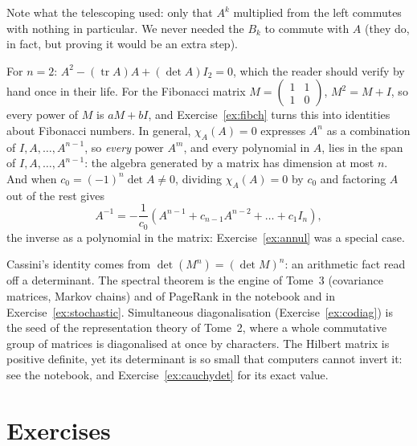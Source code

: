Note what the telescoping used: only that $A^k$ multiplied from the left commutes with nothing in particular. We never needed the $B_k$ to commute with $A$ (they do, in fact, but proving it would be an extra step).

\begin{examplex}
For $n=2$: $A^2-(\operatorname{tr}A)A+(\det A)I_2=0$, which the reader should verify by hand once in their life. For the Fibonacci matrix $M=\begin{pmatrix}1&1\\1&0\end{pmatrix}$, $M^2=M+I$, so every power of $M$ is $aM+bI$, and Exercise~\ref{ex:fibch} turns this into identities about Fibonacci numbers. In general, $\chi_A(A)=0$ expresses $A^n$ as a combination of $I,A,\dots,A^{n-1}$, so \emph{every} power $A^m$, and every polynomial in $A$, lies in the span of $I,A,\dots,A^{n-1}$: the algebra generated by a matrix has dimension at most $n$. And when $c_0=(-1)^n\det A\ne0$, dividing $\chi_A(A)=0$ by $c_0$ and factoring $A$ out of the rest gives
\[
A^{-1}=-\frac1{c_0}\left(A^{n-1}+c_{n-1}A^{n-2}+\dots+c_1I_n\right),
\]
the inverse as a polynomial in the matrix: Exercise~\ref{ex:annul} was a special case.
\end{examplex}

\begin{beauty}
Cassini's identity comes from $\det(M^n)=(\det M)^n$: an arithmetic fact read off a determinant. The spectral theorem is the engine of
Tome~3 (covariance matrices, Markov chains) and of PageRank in the notebook and in Exercise~\ref{ex:stochastic}. Simultaneous diagonalisation (Exercise~\ref{ex:codiag}) is the
seed of the representation theory of Tome~2, where a whole commutative group of matrices is diagonalised at once by characters.
The Hilbert matrix is positive definite, yet its determinant is so small that computers cannot invert it: see the notebook, and Exercise~\ref{ex:cauchydet} for its exact value.
\end{beauty}


\section{Exercises}

